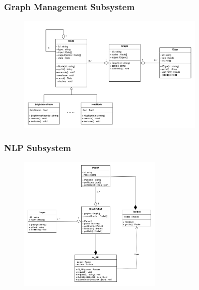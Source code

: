 \documentclass[11pt,a4paper]{article}
\begin{document}
\subsubsection*{Graph Management Subsystem}
\begin{figure}[htbp]
  \centering
  \href{https://drive.google.com/drive/u/2/folders/1rnYMSGTOmKY8_pOyJUIacjTxuubO_6NX}
  {\includegraphics[width=0.8\textwidth]{../diagramPng/Graph-Subsystem.png}}
\end{figure}


\subsubsection*{NLP Subsystem}
\begin{figure}[htbp]
    \centering
    \href{https://drive.google.com/drive/u/2/folders/1rnYMSGTOmKY8_pOyJUIacjTxuubO_6NX}
    {\includegraphics[width=0.61\textwidth]{../diagramPng/Graph Parsing-Subsystem.png}}
\end{figure}

\pagebreak
{}
\end{document}

